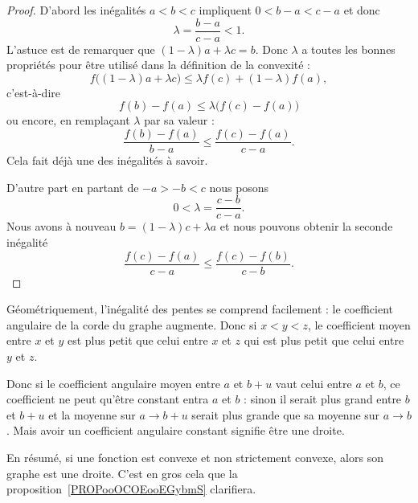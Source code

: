 \begin{proof}
	D'abord les inégalités \( a<b<c\) impliquent \( 0<b-a<c-a\) et donc
	\begin{equation}
		\lambda=\frac{ b-a }{ c-a }<1.
	\end{equation}
	L'astuce est de remarquer que \( (1-\lambda)a+\lambda c=b\). Donc \( \lambda\) a toutes les bonnes propriétés pour être utilisé dans la définition de la convexité :
	\begin{equation}
		f\big( (1-\lambda)a+\lambda c \big)\leq \lambda f(c)+(1-\lambda)f(a),
	\end{equation}
	c'est-à-dire
	\begin{equation}
		f(b)-f(a)\leq \lambda\big( f(c)-f(a) \big)
	\end{equation}
	ou encore, en remplaçant \( \lambda\) par sa valeur :
	\begin{equation}
		\frac{ f(b)-f(a) }{ b-a }\leq \frac{ f(c)-f(a) }{ c-a }.
	\end{equation}
	Cela fait déjà une des inégalités à savoir.

	D'autre part en partant de \( -a>-b<c\) nous posons
	\begin{equation}
		0<\lambda=\frac{ c-b }{ c-a }.
	\end{equation}
	Nous avons à nouveau \( b=(1-\lambda)c+\lambda a\) et nous pouvons obtenir la seconde inégalité
	\begin{equation}
		\frac{ f(c)-f(a) }{ c-a }\leq \frac{ f(c)-f(b) }{ c-b }.
	\end{equation}
\end{proof}

Géométriquement, l'inégalité des pentes se comprend facilement : le coefficient angulaire de la corde du graphe augmente. Donc si \( x<y<z\), le coefficient moyen entre \( x\) et \( y\) est plus petit que celui entre \( x\) et \( z\) qui est plus petit que celui entre \( y\) et \( z\).

Donc si le coefficient angulaire moyen entre \( a\) et \( b+u\) vaut celui entre \( a\) et \( b\), ce coefficient ne peut qu'être constant entra \( a\) et \( b\) : sinon il serait plus grand entre \( b\) et \( b+u\) et la moyenne sur \( a\to b+u\) serait plus grande que sa moyenne sur \( a\to b\). Mais avoir un coefficient angulaire constant signifie être une droite.

En résumé, si une fonction est convexe et non strictement convexe, alors son graphe est une droite. C'est en gros cela que la proposition~\ref{PROPooOCOEooEGybmS} clarifiera.

